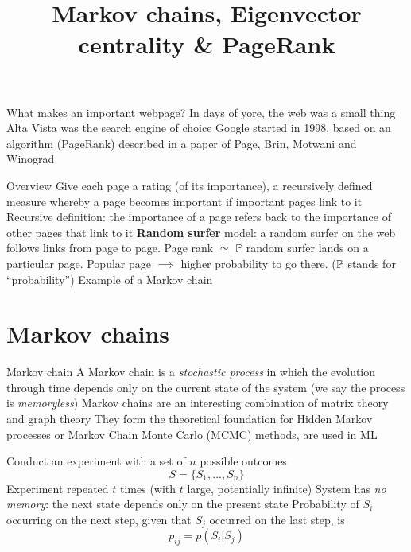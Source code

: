 \documentclass[aspectratio=169]{beamer}
\title{Markov chains, Eigenvector centrality \& PageRank}
\date{}
\begin{document}
\begin{frame}
	\titlepage
\end{frame}


\begin{frame}{What makes an important webpage?}
	In days of yore, the web was a small thing
	\vfill
	Alta Vista was the search engine of choice
	\vfill
	Google started in 1998, based on an algorithm (PageRank) described in a paper of Page, Brin, Motwani and Winograd
\end{frame}

\begin{frame}{Overview}
	Give each page a rating (of its importance), a recursively defined measure whereby a page becomes important if important pages link to it
	\vfill
	Recursive definition: the importance of a page refers back to the importance of other pages that link to it
	\vfill
	\textbf{Random surfer} model: a random surfer on the web follows links from page to page. Page rank $\simeq$ $\mathbb{P}$ random surfer lands on a particular page. Popular page $\implies$ higher probability to go there.  
	($\mathbb{P}$ stands for ``probability'')
	\vfill Example of a Markov chain
\end{frame}

\section{Markov chains}
\begin{frame}{Markov chain}
	A Markov chain is a \emph{stochastic process} in which the evolution through time depends only on the current state of the system (we say the process is \emph{memoryless})
	\vfill
	Markov chains are an interesting combination of matrix theory and graph theory
	\vfill
	They form the theoretical foundation for Hidden Markov processes or Markov Chain Monte Carlo (MCMC) methods, are used in ML
\end{frame}



\begin{frame}
Conduct an experiment with a set of $n$ possible outcomes
\[
S=\{S_1,\dots, S_n\}
\]
\vfill
Experiment repeated $t$ times (with $t$ large, potentially infinite)
\vfill 
System has \emph{no memory}: the next state depends only on the present state
\vfill
Probability of $S_i$ occurring on the next step, given that $S_j$ occurred on the last step, is
\[
p_{ij}=p(S_i|S_j)
\]
\end{frame}
\end{document}
